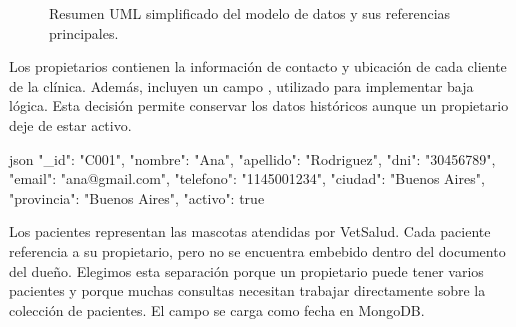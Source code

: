\documentclass[10pt,a4paper]{article}
\newcommand{\code}[1]{\codeinline{#1}}
\begin{document}
\begin{figure}[H]
{%
}
\caption{Resumen UML simplificado del modelo de datos y sus referencias principales.}
\end{figure}

Los propietarios contienen la información de contacto y ubicación de cada cliente de la clínica. Además, incluyen un campo \code{activo}, utilizado para implementar baja lógica. Esta decisión permite conservar los datos históricos aunque un propietario deje de estar activo.

\begin{codeblock}{json}
{
  "_id": "C001",
  "nombre": "Ana",
  "apellido": "Rodriguez",
  "dni": "30456789",
  "email": "ana@gmail.com",
  "telefono": "1145001234",
  "ciudad": "Buenos Aires",
  "provincia": "Buenos Aires",
  "activo": true
}
\end{codeblock}

Los pacientes representan las mascotas atendidas por VetSalud. Cada paciente referencia a su propietario, pero no se encuentra embebido dentro del documento del dueño. Elegimos esta separación porque un propietario puede tener varios pacientes y porque muchas consultas necesitan trabajar directamente sobre la colección de pacientes. El campo \code{fecha\_nac} se carga como fecha en MongoDB.
\end{document}
